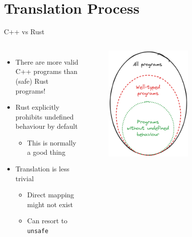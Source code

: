 \documentclass[10pt,aspectratio=169]{beamer}
\begin{document}
\section{Translation Process}

\begin{frame}{C++ vs Rust}
    \begin{columns}[onlytextwidth]
        \centering
            \begin{itemize}
                \item There are more valid C++ programs than (safe) Rust programs!
                \item Rust explicitly prohibits undefined behaviour by default
                \begin{itemize}
                    \item This is normally a good thing
                \end{itemize}
                \vspace*{0.5cm}
                \item Translation is less trivial
                \begin{itemize}
                    \item Direct mapping might not exist
                    \item Can resort to \texttt{unsafe} %
                \end{itemize}
            \end{itemize}
            \begin{figure}[H]
                \includegraphics[width=0.65\textwidth]{images/excalidraw_programs_venn.png}

\end{figure}
\end{columns}
\end{frame}
\end{document}
